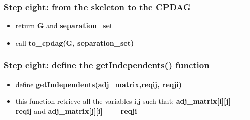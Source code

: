 \documentclass[xcolor ={table,usenames,dvipsnames}]{beamer}
\theoremstyle{definition}
\begin{document}
\begin{frame}
\frametitle{Step eight: from the skeleton to the CPDAG}
\begin{itemize}
	\item return \textbf{G} and \textbf{separation\_set}
	\item call \textbf{to\_cpdag(G, separation\_set)}
\end{itemize}
\end{frame}

\begin{frame}
\frametitle{Step eight: define the getIndependents() function}
\begin{itemize}
	\item define \textbf{getIndependents(adj\_matrix,reqij, reqji)}
	\item this function retrieve all the variables i,j such that: \textbf{adj\_matrix[i][j] == reqij} and \textbf{adj\_matrix[j][i] == reqji}
\end{itemize}
\end{frame}
\end{document}
